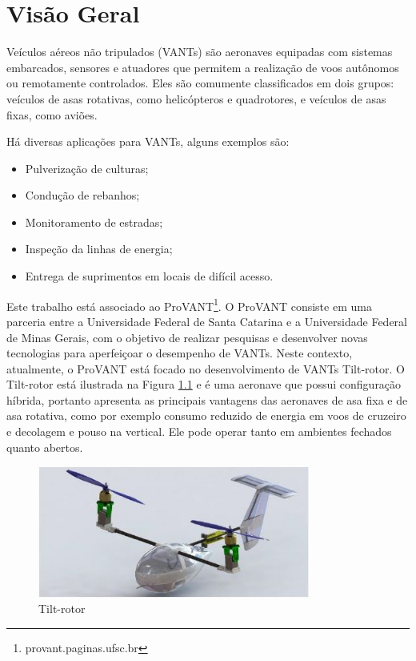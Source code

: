 \chapter{Visão Geral}


Veículos aéreos não tripulados (VANTs) são aeronaves equipadas com sistemas embarcados, sensores e atuadores que permitem a realização de voos autônomos ou remotamente controlados. Eles são comumente classificados em dois grupos: veículos de asas rotativas, como helicópteros e quadrotores, e veículos de asas fixas, como aviões. 

Há diversas aplicações para VANTs, alguns exemplos são:

\begin{itemize}
	\itemsep0em
	\item Pulverização de culturas;
	\item Condução de rebanhos;
	\item Monitoramento de estradas;
	\item Inspeção da linhas de energia;
	\item Entrega de suprimentos em locais de difícil acesso.
\end{itemize}

Este trabalho está associado ao ProVANT\footnote{provant.paginas.ufsc.br}. O ProVANT consiste em uma parceria entre a Universidade Federal de Santa Catarina e a Universidade Federal de Minas Gerais, com o objetivo de realizar pesquisas e desenvolver novas tecnologias para aperfeiçoar o desempenho de VANTs. Neste contexto, atualmente, o ProVANT está focado no desenvolvimento de VANTs Tilt-rotor.  O Tilt-rotor está ilustrada na Figura \ref{vant.jpg} e é uma aeronave que possui configuração híbrida, portanto apresenta as principais vantagens das aeronaves de asa fixa e de asa rotativa, como por exemplo consumo reduzido de energia em voos de cruzeiro e decolagem e pouso na vertical. Ele pode operar tanto em ambientes fechados quanto abertos.

\begin{figure}[!ht]
	\centering
	\includegraphics[width=0.8\textwidth]{figuras/VANT3.JPG}
	\caption{Tilt-rotor}
	\label{vant.jpg}
\end{figure}


